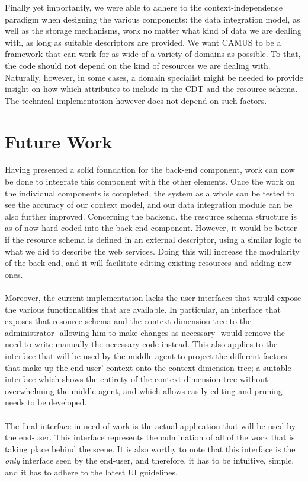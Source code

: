 Finally yet importantly, we were able to adhere to the context-independence paradigm when designing the various components: the data integration model, as well as the storage mechanisms, work no matter what kind of data we are dealing with, as long as suitable descriptors are provided. We want CAMUS to be a framework that can work for as wide of a variety of domains as possible. To that, the code should not depend on the kind of resources we are dealing with. Naturally, however, in some cases, a domain specialist might be needed to provide insight on how which attributes to include in the CDT and the resource schema. The technical implementation however does not depend on such factors.
\section{Future Work}
Having presented a solid foundation for the back-end component, work can now be done to integrate this component with the other elements. Once the work on the individual components is completed, the system as a whole can be tested to see the accuracy of our context model, and our data integration module can be also further improved. Concerning the backend, the resource schema structure is as of now hard-coded into the back-end component. However, it would be better if the resource schema is defined in an external descriptor, using a similar logic to what we did to describe the web services. Doing this will increase the modularity of the back-end, and it will facilitate editing existing resources and adding new ones.\\\\
Moreover, the current implementation lacks the user interfaces that would expose the various functionalities that are available. In particular, an interface that exposes that resource schema and the context dimension tree to the administrator -allowing him to make changes as necessary- would remove the need to write manually the necessary code instead. This also applies to the interface that will be used by the middle agent to project the different factors that make up the end-user' context onto the context dimension tree; a suitable interface which shows the entirety of the context dimension tree without overwhelming the middle agent, and which allows easily editing and pruning needs to be developed.\\\\
The final interface in need of work is the actual application that will be used by the end-user. This interface represents the culmination of all of the work that is taking place behind the scene. It is also worthy to note that this interface is the \emph{only} interface seen by the end-user, and therefore, it has to be intuitive, simple, and it has to adhere to the latest UI guidelines.\\\\
